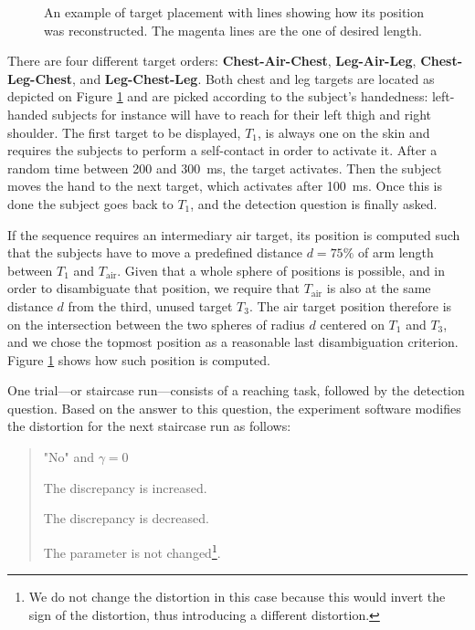 \begin{figure}
    \caption{An example of target placement with lines showing how its position was reconstructed. The magenta lines are the one of desired length.}\label{fig:targetPlacement}
\end{figure}

There are four different target orders: \textbf{Chest-Air-Chest}, \textbf{Leg-Air-Leg}, \textbf{Chest-Leg-Chest}, and \textbf{Leg-Chest-Leg}. Both chest and leg targets are located as depicted on Figure \ref{fig:targetPlacement} and are picked according to the subject's handedness: left-handed subjects for instance will have to reach for their left thigh and right shoulder. The first target to be displayed, $T_1$, is always one on the skin and requires the subjects to perform a self-contact in order to activate it. After a random time between \num{200} and \SI{300}{\milli\second}, the target activates. Then the subject moves the hand to the next target, which activates after \SI{100}{\milli\second}. Once this is done the subject goes back to $T_1$, and the detection question is finally asked.

If the sequence requires an intermediary air target, its position is computed such that the subjects have to move a predefined distance $d = 75\%$ of arm length between $T_1$ and $T_{\text{air}}$. Given that a whole sphere of positions is possible, and in order to disambiguate that position, we require that $T_\text{air}$ is also at the same distance $d$ from the third, unused target $T_3$. The air target position therefore is on the intersection between the two spheres of radius $d$ centered on $T_1$ and $T_3$, and we chose the topmost position as a reasonable last disambiguation criterion. Figure \ref{fig:targetPlacement} shows how such position is computed.

One trial---or staircase run---consists of a reaching task, followed by the detection question. Based on the answer to this question, the experiment software modifies the distortion for the next staircase run as follows:
\begin{quote}
    \begin{labeling}{"No" and $\gamma = 0$}
      \item ["Yes"] The discrepancy is increased.
      \item ["No" and $\gamma \neq 0$] The discrepancy is decreased.
      \item ["No" and $\gamma = 0$] The parameter is not changed\footnote{We do not change the distortion in this case because this would invert the sign of the distortion, thus introducing a different distortion.}.
    \end{labeling}
\end{quote}

